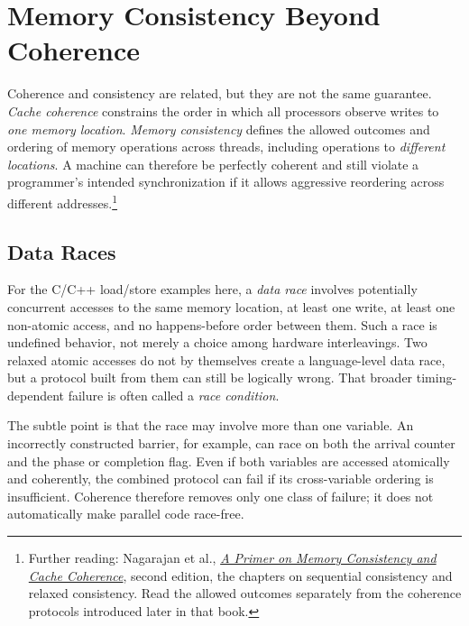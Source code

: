 \section{Memory Consistency Beyond Coherence}\label{sec:sync-consistency}
Coherence and consistency are related, but they are not the same guarantee.
\textit{Cache coherence} constrains the order in which all processors observe writes to \emph{one memory location}.
\textit{Memory consistency} defines the allowed outcomes and ordering of memory operations across threads, including operations to \emph{different locations}.
A machine can therefore be perfectly coherent and still violate a programmer's intended synchronization if it allows aggressive reordering across different addresses.\footnote{Further reading: Nagarajan et al., \href{https://pages.cs.wisc.edu/~markhill/papers/primer2020_2nd_edition.pdf}{\emph{A Primer on Memory Consistency and Cache Coherence}}, second edition, the chapters on sequential consistency and relaxed consistency. Read the allowed outcomes separately from the coherence protocols introduced later in that book.}

\subsection*{Data Races}
For the C/C++ load/store examples here, a \textit{data race} involves potentially concurrent accesses to the same memory location, at least one write, at least one non-atomic access, and no happens-before order between them.
Such a race is undefined behavior, not merely a choice among hardware interleavings.
Two relaxed atomic accesses do not by themselves create a language-level data race, but a protocol built from them can still be logically wrong.
That broader timing-dependent failure is often called a \textit{race condition}.

The subtle point is that the race may involve more than one variable.
An incorrectly constructed barrier, for example, can race on both the arrival counter and the phase or completion flag.
Even if both variables are accessed atomically and coherently, the combined protocol can fail if its cross-variable ordering is insufficient.
Coherence therefore removes only one class of failure; it does not automatically make parallel code race-free.


